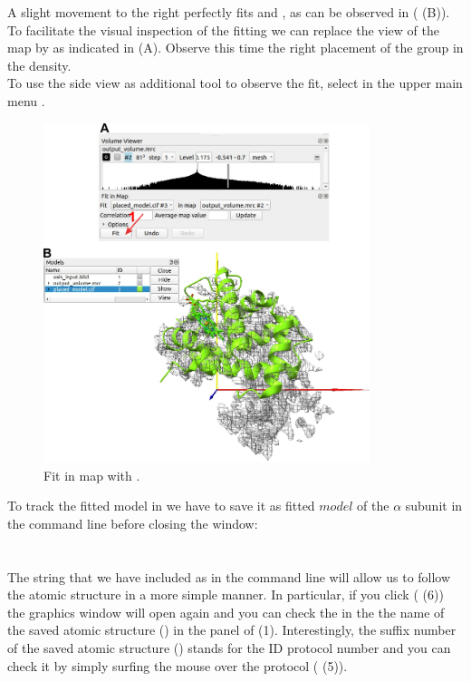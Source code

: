   A slight movement to the right perfectly fits  and , as can be observed in ( (B)). To facilitate the visual inspection of the fitting we can replace the  view of the map by  as indicated in (A). Observe this time the right placement of the  group in the  density.\\
  To use the side view as additional tool to observe the fit, select in the upper main menu .
  
  \begin{figure}[H]
  \centering 
  \captionsetup{width=.7\linewidth} 
  \includegraphics[width=0.85\textwidth]{Images/Fig22}
  \caption{Fit in map with \chimera.}
  \label{fig:chimera_fit_in_map}
  \end{figure}
  
  To track the \chimera fitted model in \scipion we have to save it as fitted $model$ of the  $\alpha$ subunit in the \chimera command line before closing the \chimera window:\\
  \\
  \\
  
  The string that we have included as  in the command line will allow us to follow the atomic structure in a more simple manner. In particular, if you click  ( (6)) the \chimera graphics window will open again and you can check the  in the the name of the saved atomic structure () in the  panel of  (1). Interestingly, the suffix number of the saved atomic structure () stands for the ID protocol number and you can check it by simply surfing the mouse over the protocol ( (5)).
  
